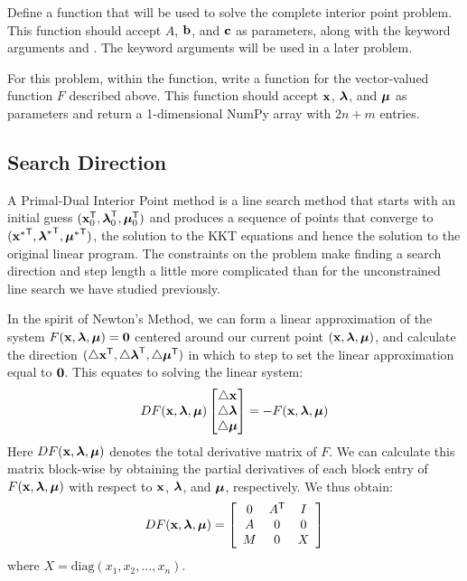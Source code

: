\begin{problem} %
Define a function  that will be used to solve the complete interior point problem.
This function should accept $A$, $\mathbf{b}$, and $\mathbf{c}$ as parameters, along with the keyword arguments  and .
The keyword arguments will be used in a later problem.

For this problem, within the  function, write a function for the vector-valued function $F$ described above.
This function should accept $\mathbf{x}$, $\boldsymbol{\lambda}$, and $\boldsymbol{\mu}$ as parameters and return a 1-dimensional NumPy array with $2n+m$ entries.
\end{problem}

\subsection*{Search Direction}

A Primal-Dual Interior Point method is a line search method that starts with an initial guess $(\mathbf{x}_0^{\mathsf T} , \boldsymbol{\lambda}_0^{\mathsf T} , \boldsymbol{\mu}_0^{\mathsf T} )$ and produces a sequence of points that converge to $({\mathbf{x}^*}^{\mathsf T} , {\boldsymbol{\lambda}^*}^{\mathsf T} , {\boldsymbol{\mu}^*}^{\mathsf T} )$, the solution to the KKT equations and hence the solution to the original linear program.
The constraints on the problem make finding a search direction and step length a little more complicated than for the unconstrained line search we have studied previously.

In the spirit of Newton's Method, we can form a linear approximation of the system $F(\mathbf{x},\boldsymbol{\lambda},\boldsymbol{\mu}) = \mathbf{0}$ centered around our current point $(\mathbf{x}, \boldsymbol{\lambda}, \boldsymbol{\mu})$, and calculate the direction $(\triangle \mathbf{x}^{\mathsf T} , \triangle \boldsymbol{\lambda}^{\mathsf T} , \triangle \boldsymbol{\mu}^{\mathsf T} )$ in which to step to set the linear approximation equal to $\mathbf{0}$.
This equates to solving the linear system:
\begin{align}
DF(\mathbf{x},\boldsymbol{\lambda},\boldsymbol{\mu})
\begin{bmatrix}\triangle \mathbf{x}\\ \triangle \boldsymbol{\lambda}\\ \triangle \boldsymbol{\mu}\end{bmatrix}
= - F(\mathbf{x},\boldsymbol{\lambda},\boldsymbol{\mu}) \label{eq:naiveNewton}
\end{align}
Here $DF(\mathbf{x},\boldsymbol{\lambda},\boldsymbol{\mu})$ denotes the total derivative matrix of $F$.
We can calculate this matrix block-wise by obtaining the partial derivatives of each block entry of $F(\mathbf{x},\boldsymbol{\lambda}, \boldsymbol{\mu})$ with respect to $\mathbf{x}$, $\boldsymbol{\lambda}$, and $\boldsymbol{\mu}$, respectively.
We thus obtain:
\[
DF(\mathbf{x},\boldsymbol{\lambda},\boldsymbol{\mu}) = \left[\begin{array}{ccc}
0 & A^{\mathsf T}  & I \\
A & 0 & 0 \\
M & 0 & X
\end{array}\right]
\]
where $X = \text{diag}(x_1,x_2,\ldots,x_n).$

